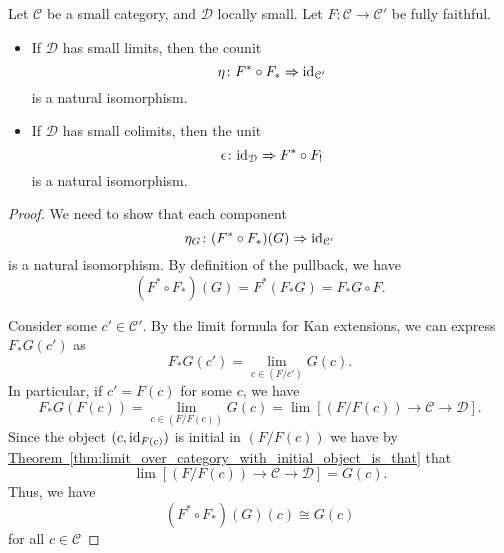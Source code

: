 \documentclass[main.tex]{subfiles}
\begin{document}
\begin{theorem}
  \label{thm:kan_extension_along_fully_faithful_functor_counit_isomorphism}
  Let $\mathcal{C}$ be a small category, and $\mathcal{D}$ locally small. Let $F\colon \mathcal{C} \to \mathcal{C'}$ be fully faithful.
  \begin{itemize}
    \item If $\mathcal{D}$ has small limits, then the counit
      \begin{equation*}
        \eta\colon F^{*} \circ F_{*} \Rightarrow \mathrm{id}_{\mathcal{C}'}
      \end{equation*}
      is a natural isomorphism.

    \item If $\mathcal{D}$ has small colimits, then the unit
      \begin{equation*}
        \epsilon\colon \mathrm{id}_{\mathcal{D}} \Rightarrow F^{*} \circ F_{!}
      \end{equation*}
      is a natural isomorphism.
  \end{itemize}
\end{theorem}
\begin{proof}
  We need to show that each component
  \begin{equation*}
    \eta_{G}\colon (F^{*} \circ F_{*})(G) \Rightarrow \mathrm{id}_{\mathcal{C}'}
  \end{equation*}
  is a natural isomorphism. By definition of the pullback, we have
  \begin{equation*}
    (F^{*} \circ F_{*})(G) = F^{*}(F_{*}G) = F_{*}G \circ F.
  \end{equation*}

  Consider some $c' \in \mathcal{C}'$. By the limit formula for Kan extensions, we can express $F_{*}G(c')$ as
  \begin{equation*}
    F_{*}G(c') = \lim_{c \in (F / c')} G(c).
  \end{equation*}
  In particular, if $c' = F(c)$ for some $c$, we have
  \begin{equation*}
    F_{*}G(F(c)) = \lim_{c \in (F / F(c))} G(c) = \lim\left[ (F / F(c)) \to \mathcal{C} \to \mathcal{D} \right].
  \end{equation*}
  Since the object $(c, \mathrm{id}_{F(c)})$ is initial in $(F / F(c))$ we have by \hyperref[thm:limit_over_category_with_initial_object_is_that]{Theorem~\ref*{thm:limit_over_category_with_initial_object_is_that}} that
  \begin{equation*}
    \lim\left[ (F / F(c)) \to \mathcal{C} \to \mathcal{D} \right] = G(c).
  \end{equation*}
  Thus, we have
  \begin{equation*}
    (F^{*} \circ F_{*})(G)(c) \cong G(c)
  \end{equation*}
  for all $c \in \mathcal{C}$
\end{proof}
\end{document}
